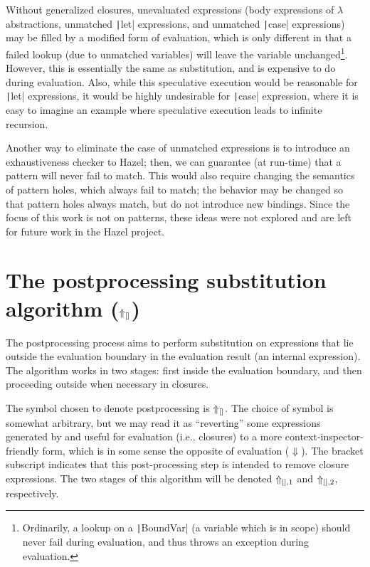 Without generalized closures, unevaluated expressions (body expressions of $\lambda$ abstractions, unmatched \texttt|let| expressions, and unmatched \texttt|case| expressions) may be filled by a modified form of evaluation, which is only different in that a failed lookup (due to unmatched variables) will leave the variable unchanged\footnote{Ordinarily, a lookup on a \texttt|BoundVar| (a variable which is in scope) should never fail during evaluation, and thus throws an exception during evaluation.}. However, this is essentially the same as substitution, and is expensive to do during evaluation. Also, while this speculative execution would be reasonable for \texttt|let| expressions, it would be highly undesirable for \texttt|case| expression, where it is easy to imagine an example where speculative execution leads to infinite recursion.

Another way to eliminate the case of unmatched expressions is to introduce an exhaustiveness checker to Hazel; then, we can guarantee (at run-time) that a pattern will never fail to match. This would also require changing the semantics of pattern holes, which always fail to match; the behavior may be changed so that pattern holes always match, but do not introduce new bindings. Since the focus of this work is not on patterns, these ideas were not explored and are left for future work in the Hazel project.

\section{The postprocessing substitution algorithm ($\Uparrow_{[]}$)}
\label{sec:postprocessing-substitution}

The postprocessing process aims to perform substitution on expressions that lie outside the evaluation boundary in the evaluation result (an internal expression). The algorithm works in two stages: first inside the evaluation boundary, and then proceeding outside when necessary in closures.

The symbol chosen to denote postprocessing is $\Uparrow_{[]}$. The choice of symbol is somewhat arbitrary, but we may read it as ``reverting'' some expressions generated by and useful for evaluation (i.e., closures) to a more context-inspector-friendly form, which is in some sense the opposite of evaluation ($\Downarrow$). The bracket subscript indicates that this post-processing step is intended to remove closure expressions. The two stages of this algorithm will be denoted $\Uparrow_{[],1}$ and $\Uparrow_{[],2}$, respectively.

